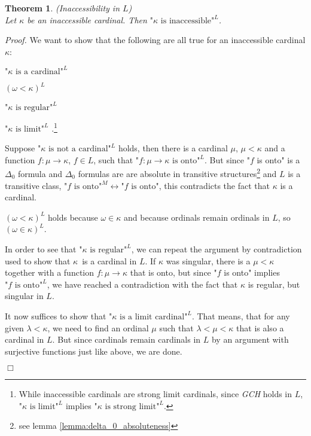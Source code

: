 \documentclass[12pt,a4paper]{article}
\newtheorem{theorem}{Theorem}[section]
\newenvironment{proof}
{\noindent \textit{Proof.}}
{\hspace*{\fill} $\Box$}
\renewcommand{\iff}{\leftrightarrow}
\newcommand{\then}{\rightarrow}
\newcommand{\bce}{\begin{compactenum}}
\newcommand{\ece}{\end{compactenum}}
\begin{document}
\begin{theorem}{(Inaccessibility in $L$)}\label{theorem:inaccessible_in_l}\\
Let $\kappa$ be an inaccessible cardinal. Then $\mbox{"$\kappa$ is inaccessible"}^L$.
\end{theorem}
\begin{proof}
We want to show that the following are all true for an inaccessible cardinal $\kappa$:
\bce[(i)] 
\item $\mbox{"$\kappa$ is a cardinal"}^L$
\item $(\omega < \kappa)^L$
\item $\mbox{"$\kappa$ is regular"}^L$
\item $\mbox{"$\kappa$ is limit"}^L$ .\footnote{While inaccessible cardinals are strong limit cardinals, since \emph{GCH} holds in $L$, $\mbox{"$\kappa$ is limit"}^L$ 
implies $\mbox{"$\kappa$ is strong limit"}^L$.}
\ece

Suppose $\mbox{"$\kappa$ is not a cardinal"}^L$ holds, then there is a cardinal $\mu$, $\mu < \kappa$ and a function $f:\mu\then\kappa$, $f \in L$, such that $\mbox{"$f:\mu\then\kappa$ is onto"}^L$. But since "$f$ is onto" is a $\Delta_0$ formula and $\Delta_0$ formulas are are absolute in transitive structures\footnote{see lemma \ref{lemma:delta_0_absoluteness}} and $L$ is a transitive class, $\mbox{"$f$ is onto"}^M \iff \mbox{"$f$ is onto"}$, this contradicts the fact that $\kappa$ is a cardinal.

$(\omega < \kappa)^L$ holds because $\omega \in \kappa$ and because ordinals remain ordinals in $L$, so $(\omega \in \kappa)^L$.

In order to see that $\mbox{"$\kappa$ is regular"}^L$, we can repeat the argument by contradiction used to show that $\kappa$ is a cardinal in $L$. If $\kappa$ was singular, there is a $\mu < \kappa$ together with a function $f: \mu \then \kappa$ that is onto, but since "$f$ is onto" implies $\mbox{"$f$ is onto"}^L$, we have reached a contradiction with the fact that $\kappa$ is regular, but singular in $L$.

It now suffices to show that $\mbox{"$\kappa$ is a limit cardinal"}^L$. That means, that for any given $\lambda<\kappa$, we need to find an ordinal $\mu$ such that $\lambda < \mu < \kappa$ that is also a cardinal in $L$. But since cardinals remain cardinals in $L$ by an argument with surjective functions just like above, we are done.

\end{proof}
\end{document}
